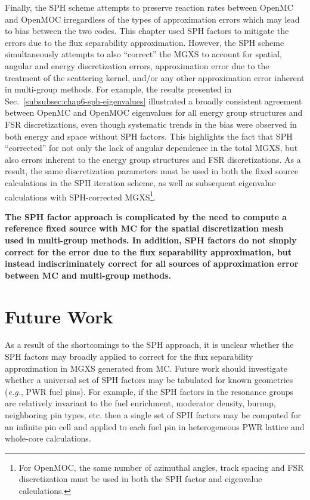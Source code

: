 Finally, the \ac{SPH} scheme attempts to preserve reaction rates between OpenMC and OpenMOC irregardless of the types of approximation errors which may lead to bias between the two codes. This chapter used \ac{SPH} factors to mitigate the errors due to the flux separability approximation. However, the \ac{SPH} scheme simultaneously attempts to also ``correct'' the \ac{MGXS} to account for spatial, angular and energy discretization errors, approximation error due to the treatment of the scattering kernel, and/or any other approximation error inherent in multi-group methods. For example, the results presented in Sec.~\ref{subsubsec:chap6-sph-eigenvalues} illustrated a broadly consistent agreement between OpenMC and OpenMOC eigenvalues for all energy group structures and \ac{FSR} discretizations, even though systematic trends in the bias were observed in both energy and space without \ac{SPH} factors. This highlights the fact that \ac{SPH} ``corrected'' for not only the lack of angular dependence in the total \ac{MGXS}, but also errors inherent to the energy group structures and \ac{FSR} discretizations. As a result, the same discretization parameters must be used in both the fixed source calculations in the \ac{SPH} iteration scheme, as well as subsequent eigenvalue calculations with \ac{SPH}-corrected \ac{MGXS}\footnote{For OpenMOC, the same number of azimuthal angles, track spacing and \ac{FSR} discretization must be used in both the \ac{SPH} factor and eigenvalue calculations.}.

\clearpage

\begin{emphbox}
\textbf{The \ac{SPH} factor approach is complicated by the need to compute a reference fixed source with \ac{MC} for the spatial discretization mesh used in multi-group methods. In addition, \ac{SPH} factors do not simply correct for the error due to the flux separability approximation, but instead indiscriminately correct for all sources of approximation error between \ac{MC} and multi-group methods.}
\end{emphbox}

\section{Future Work}
\label{sec:chap6-sph-future}

As a result of the shortcomings to the \ac{SPH} approach, it is unclear whether the \ac{SPH} factors may broadly applied to correct for the flux separability approximation in \ac{MGXS} generated from \ac{MC}. Future work should investigate whether a universal set of \ac{SPH} factors may be tabulated for known geometries (\textit{e.g.}, \ac{PWR} fuel pins). For example, if the \ac{SPH} factors in the resonance groups are relatively invariant to the fuel enrichment, moderator density, burnup, neighboring pin types, etc. then a single set of \ac{SPH} factors may be computed for an infinite pin cell and applied to each fuel pin in heterogeneous \ac{PWR} lattice and whole-core calculations. 

